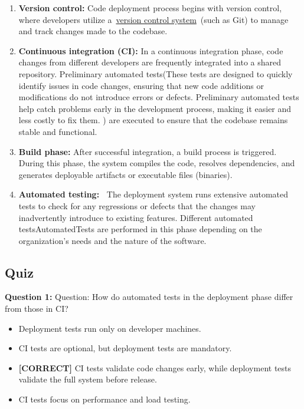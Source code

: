 \begin{enumerate}
\item
\protect{}\label{EUaWgMTFi2El2YKasrBjc}
\textbf{Version control:} Code deployment process begins with version control, where developers utilize a~\href{https://www.educative.io/courses/getting-started-with-git-version-control}{version control system}~(such as Git) to manage and track changes made to the codebase.
\item
\protect{}\label{D6HyS1o_TTqfEV7tgH3d7}
\textbf{Continuous integration (CI):} In a continuous integration phase, code changes from different developers are frequently integrated into a shared repository. Preliminary automated tests(These tests are designed to quickly identify issues in code changes, ensuring that new code additions or modifications do not introduce errors or defects. Preliminary automated tests help catch problems early in the development process, making it easier and less costly to fix them. ) are executed to ensure that the codebase remains stable and functional.
\item
\protect{}\label{SOA4aORUEgTXNrJrwPz2P}
\textbf{Build phase:} After successful integration, a build process is triggered. During this phase, the system compiles the code, resolves dependencies, and generates deployable artifacts or executable files (binaries).
\item
\protect{}\label{WKup23FeVwH09aZmJaXZj}
\textbf{Automated testing:~} The deployment system runs extensive automated tests to check for any regressions or defects that the changes may inadvertently introduce to existing features. Different automated testsAutomatedTests are performed in this phase depending on the organization's needs and the nature of the software.
\end{enumerate}

\subsection*{Quiz}
\vspace{0.3cm}
\noindent
\textbf{Question 1:} Question: How do automated tests in the deployment phase differ from those in CI?
\\[0.2cm]
\begin{itemize}
 \item Deployment tests run only on developer machines.
 \item CI tests are optional, but deployment tests are mandatory.
 \item \textbf{[CORRECT]} CI tests validate code changes early, while deployment tests validate the full system before release.
 \item CI tests focus on performance and load testing.
\end{itemize}

